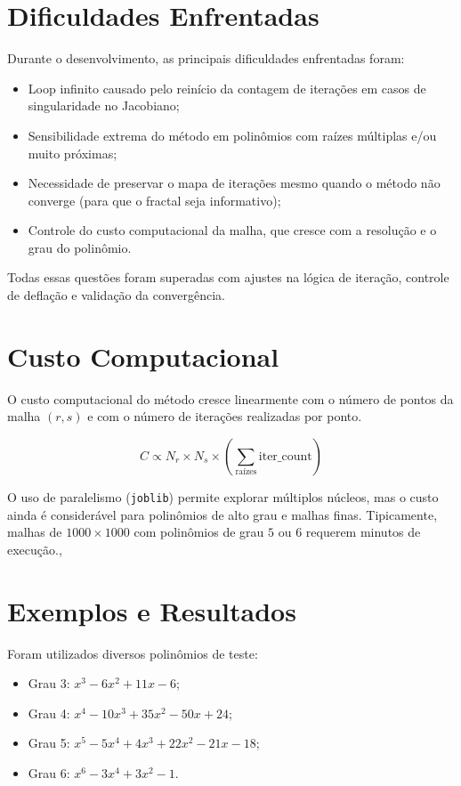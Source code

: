 \documentclass[12pt]{article}
\begin{document}
\section{Dificuldades Enfrentadas}

Durante o desenvolvimento, as principais dificuldades enfrentadas foram:

\begin{itemize}
\item Loop infinito causado pelo reinício da contagem de iterações em casos de singularidade no Jacobiano;
\item Sensibilidade extrema do método em polinômios com raízes múltiplas e/ou muito próximas;
\item Necessidade de preservar o mapa de iterações mesmo quando o método não converge (para que o fractal seja informativo);
\item Controle do custo computacional da malha, que cresce com a resolução e o grau do polinômio.
\end{itemize}

Todas essas questões foram superadas com ajustes na lógica de iteração, controle de deflação e validação da convergência.

\section{Custo Computacional}

O custo computacional do método cresce linearmente com o número de pontos da malha $(r,s)$ e com o número de iterações realizadas por ponto.

\[
C \propto N_r \times N_s \times \left(\sum_{\text{raízes}} \text{iter\_count}\right)
\]

O uso de paralelismo (\texttt{joblib}) permite explorar múltiplos núcleos, mas o custo ainda é considerável para polinômios de alto grau e malhas finas. Tipicamente, malhas de $1000 \times 1000$ com polinômios de grau $5$ ou $6$ requerem minutos de execução.,

\section{Exemplos e Resultados}

Foram utilizados diversos polinômios de teste:

\begin{itemize}
\item Grau 3: $x^3 - 6x^2 + 11x - 6$;
\item Grau 4: $x^4 - 10x^3 + 35x^2 - 50x + 24$;
\item Grau 5: $x^5 - 5x^4 + 4x^3 + 22x^2 - 21x - 18$;
\item Grau 6: $x^6 - 3x^4 + 3x^2 - 1$.
\end{itemize}
\end{document}
